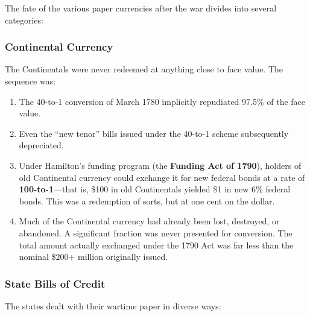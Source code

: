 \documentclass[12pt]{article}
\begin{document}
The fate of the various paper currencies after the war divides into several
categories:

\subsubsection{Continental Currency}

The Continentals were never redeemed at anything close to face value.  The
sequence was:

\begin{enumerate}[nosep]
    \item The 40-to-1 conversion of March 1780 implicitly repudiated 97.5\%
          of the face value.
    \item Even the ``new tenor'' bills issued under the 40-to-1 scheme
          subsequently depreciated.
    \item Under Hamilton's funding program (the \textbf{Funding Act of 1790}),
          holders of old Continental currency could exchange it for new federal
          bonds at a rate of \textbf{100-to-1}---that is, \$100 in old
          Continentals yielded \$1 in new 6\% federal bonds.  This was a
          redemption of sorts, but at one cent on the dollar.
    \item Much of the Continental currency had already been lost, destroyed, or
          abandoned.  A significant fraction was never presented for
          conversion.  The total amount actually exchanged under the 1790 Act
          was far less than the nominal \$200+ million originally issued.
\end{enumerate}

\subsubsection{State Bills of Credit}

The states dealt with their wartime paper in diverse ways:
\end{document}
